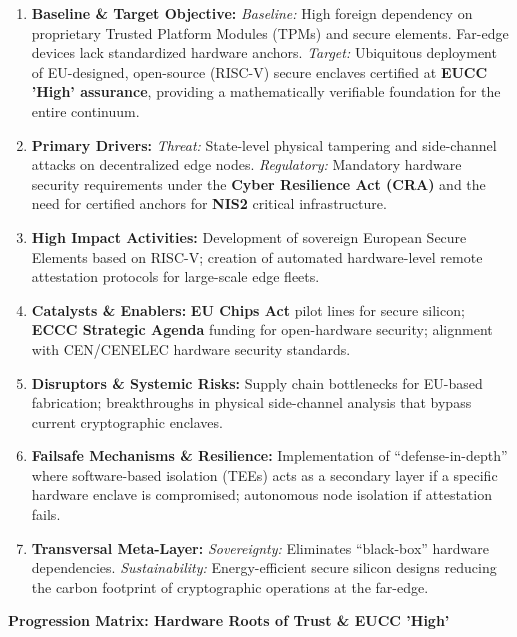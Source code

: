 \documentclass{ieeeaccess}
\begin{document}
\begin{enumerate}
\item \textbf{Baseline \& Target Objective:}
\textit{Baseline:} High foreign dependency on proprietary Trusted Platform Modules (TPMs) and secure elements. Far-edge devices lack standardized hardware anchors.
\textit{Target:} Ubiquitous deployment of EU-designed, open-source (RISC-V) secure enclaves certified at \textbf{EUCC 'High' assurance}, providing a mathematically verifiable foundation for the entire continuum.

\item \textbf{Primary Drivers:} 
\textit{Threat:} State-level physical tampering and side-channel attacks on decentralized edge nodes. 
\textit{Regulatory:} Mandatory hardware security requirements under the \textbf{Cyber Resilience Act (CRA)} and the need for certified anchors for \textbf{NIS2} critical infrastructure.

\item \textbf{High Impact Activities:} 
Development of sovereign European Secure Elements based on RISC-V; creation of automated hardware-level remote attestation protocols for large-scale edge fleets.

\item \textbf{Catalysts \& Enablers:} 
\textbf{EU Chips Act} pilot lines for secure silicon; \textbf{ECCC Strategic Agenda} funding for open-hardware security; alignment with CEN/CENELEC hardware security standards.

\item \textbf{Disruptors \& Systemic Risks:} 
Supply chain bottlenecks for EU-based fabrication; breakthroughs in physical side-channel analysis that bypass current cryptographic enclaves.

\item \textbf{Failsafe Mechanisms \& Resilience:} 
Implementation of ``defense-in-depth'' where software-based isolation (TEEs) acts as a secondary layer if a specific hardware enclave is compromised; autonomous node isolation if attestation fails.

\item \textbf{Transversal Meta-Layer:} 
\textit{Sovereignty:} Eliminates ``black-box'' hardware dependencies. \textit{Sustainability:} Energy-efficient secure silicon designs reducing the carbon footprint of cryptographic operations at the far-edge.

\end{enumerate}

\vspace{0.5cm}
\noindent\textbf{Progression Matrix: Hardware Roots of Trust \& EUCC 'High'}
\vspace{0.2cm}
\end{document}
